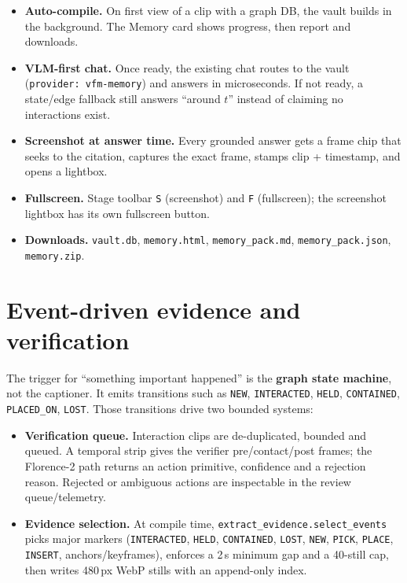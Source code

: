 \documentclass[10pt,a4paper]{article}
\newcommand{\code}[1]{\texttt{\small #1}}
\begin{document}
\begin{itemize}[leftmargin=1.25em,itemsep=1pt]
  \item \textbf{Auto-compile.} On first view of a clip with a graph DB, the vault builds in the
        background. The Memory card shows progress, then report and downloads.
  \item \textbf{VLM-first chat.} Once ready, the existing chat routes to the vault
        (\code{provider: vfm-memory}) and answers in microseconds. If not ready, a state/edge
        fallback still answers ``around $t$'' instead of claiming no interactions exist.
  \item \textbf{Screenshot at answer time.} Every grounded answer gets a frame chip that seeks to
        the citation, captures the exact frame, stamps clip + timestamp, and opens a lightbox.
  \item \textbf{Fullscreen.} Stage toolbar \code{S} (screenshot) and \code{F} (fullscreen); the
        screenshot lightbox has its own fullscreen button.
  \item \textbf{Downloads.} \code{vault.db}, \code{memory.html}, \code{memory\_pack.md},
        \code{memory\_pack.json}, \code{memory.zip}.
\end{itemize}


\section{Event-driven evidence and verification}

The trigger for “something important happened” is the \textbf{graph state machine}, not the captioner. It emits transitions such as \code{NEW}, \code{INTERACTED}, \code{HELD}, \code{CONTAINED}, \code{PLACED\_ON}, \code{LOST}. Those transitions drive two bounded systems:

\begin{itemize}[leftmargin=1.25em,itemsep=1pt]
  \item \textbf{Verification queue.} Interaction clips are de-duplicated, bounded and queued. A temporal strip gives the verifier pre/contact/post frames; the Florence-2 path returns an action primitive, confidence and a rejection reason. Rejected or ambiguous actions are inspectable in the review queue/telemetry.
  \item \textbf{Evidence selection.} At compile time, \code{extract\_evidence.select\_events} picks major markers (\code{INTERACTED}, \code{HELD}, \code{CONTAINED}, \code{LOST}, \code{NEW}, \code{PICK}, \code{PLACE}, \code{INSERT}, anchors/keyframes), enforces a 2\,s minimum gap and a 40-still cap, then writes 480\,px WebP stills with an append-only index.
\end{itemize}
\end{document}

